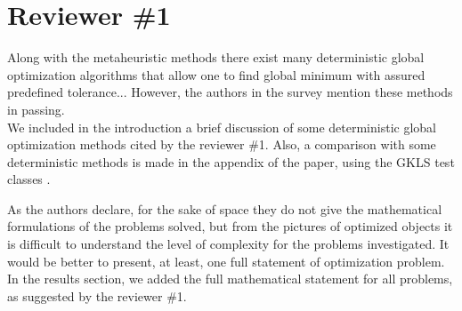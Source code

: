
\section*{Reviewer \#1}


{\color{red} Along with the metaheuristic methods there exist many deterministic global optimization algorithms that allow one to find global minimum with assured predefined tolerance... However, the authors in the survey mention these methods in passing.
}\\

We included in the introduction a brief discussion of some deterministic global optimization methods cited by the reviewer \#1. Also, a comparison with some deterministic methods is made in the appendix of the paper, using the GKLS test classes \citep{GKLS}.


\vspace{1cm}

 
{\color{red} As the authors declare, for the sake of space they do not give the mathematical formulations of the problems solved, but from the pictures of optimized objects it is difficult to understand the level of complexity for the problems investigated. It would be better to present, at least, one full statement of optimization problem.
}\\

In the results section, we added the full mathematical statement for all problems, as suggested by the reviewer \#1.


\vspace{1cm}